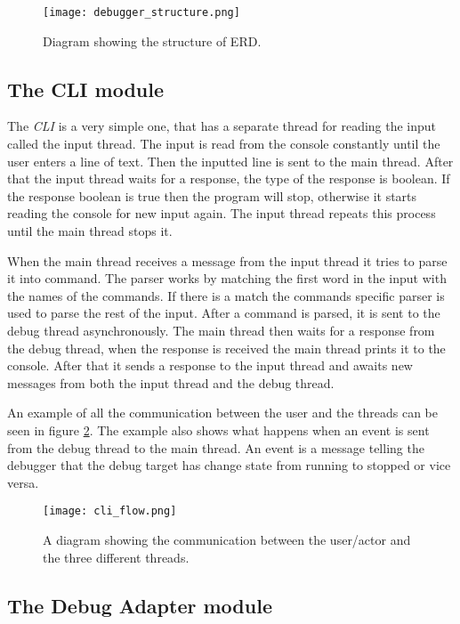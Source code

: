 \begin{figure}[h]
	\centering
	\texttt{[image: debugger\_structure.png]}
	\caption{Diagram showing the structure of ERD.}
	\label{fig:ERDStruct}
\end{figure}


\subsection{The CLI module}
The \emph{CLI} is a very simple one, that has a separate thread for reading the input called the input thread.
The input is read from the console constantly until the user enters a line of text.
Then the inputted line is sent to the main thread.
After that the input thread waits for a response, the type of the response is boolean.
If the response boolean is true then the program will stop, otherwise it starts reading the console for new input again.
The input thread repeats this process until the main thread stops it.


When the main thread receives a message from the input thread it tries to parse it into command.
The parser works by matching the first word in the input with the names of the commands.
If there is a match the commands specific parser is used to parse the rest of the input.
After a command is parsed, it is sent to the debug thread asynchronously.
The main thread then waits for a response from the debug thread, when the response is received the main thread prints it to the console.
After that it sends a response to the input thread and awaits new messages from both the input thread and the debug thread.


An example of all the communication between the user and the threads can be seen in figure \ref{fig:cliflow}.
The example also shows what happens when an event is sent from the debug thread to the main thread.
An event is a message telling the debugger that the debug target has change state from running to stopped or vice versa.


\begin{figure}[h]
	\centering
	\texttt{[image: cli\_flow.png]}
	\caption{A diagram showing the communication between the user/actor and the three different threads.}
	\label{fig:cliflow}
\end{figure}




\subsection{The Debug Adapter module}


